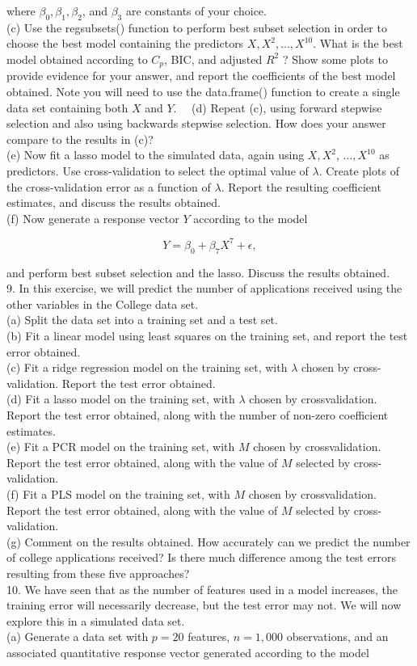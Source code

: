 \documentclass[10pt]{article}
\begin{document}
where $\beta_{0}, \beta_{1}, \beta_{2}$, and $\beta_{3}$ are constants of your choice.\\
(c) Use the regsubsets() function to perform best subset selection in order to choose the best model containing the predictors $X, X^{2}, \ldots, X^{10}$. What is the best model obtained according to $C_{p}$, BIC, and adjusted $R^{2}$ ? Show some plots to provide evidence for your answer, and report the coefficients of the best model obtained. Note you will need to use the data.frame() function to create a single data set containing both $X$ and $Y$.\
\
(d) Repeat (c), using forward stepwise selection and also using backwards stepwise selection. How does your answer compare to the results in (c)?\\
(e) Now fit a lasso model to the simulated data, again using $X, X^{2}$, $\ldots, X^{10}$ as predictors. Use cross-validation to select the optimal value of $\lambda$. Create plots of the cross-validation error as a function of $\lambda$. Report the resulting coefficient estimates, and discuss the results obtained.\\
(f) Now generate a response vector $Y$ according to the model

$$
Y=\beta_{0}+\beta_{7} X^{7}+\epsilon,
$$

and perform best subset selection and the lasso. Discuss the results obtained.\\
9. In this exercise, we will predict the number of applications received using the other variables in the College data set.\\
(a) Split the data set into a training set and a test set.\\
(b) Fit a linear model using least squares on the training set, and report the test error obtained.\\
(c) Fit a ridge regression model on the training set, with $\lambda$ chosen by cross-validation. Report the test error obtained.\\
(d) Fit a lasso model on the training set, with $\lambda$ chosen by crossvalidation. Report the test error obtained, along with the number of non-zero coefficient estimates.\\
(e) Fit a PCR model on the training set, with $M$ chosen by crossvalidation. Report the test error obtained, along with the value of $M$ selected by cross-validation.\\
(f) Fit a PLS model on the training set, with $M$ chosen by crossvalidation. Report the test error obtained, along with the value of $M$ selected by cross-validation.\\
(g) Comment on the results obtained. How accurately can we predict the number of college applications received? Is there much difference among the test errors resulting from these five approaches?\\
10. We have seen that as the number of features used in a model increases, the training error will necessarily decrease, but the test error may not. We will now explore this in a simulated data set.\\
(a) Generate a data set with $p=20$ features, $n=1,000$ observations, and an associated quantitative response vector generated according to the model
\end{document}
